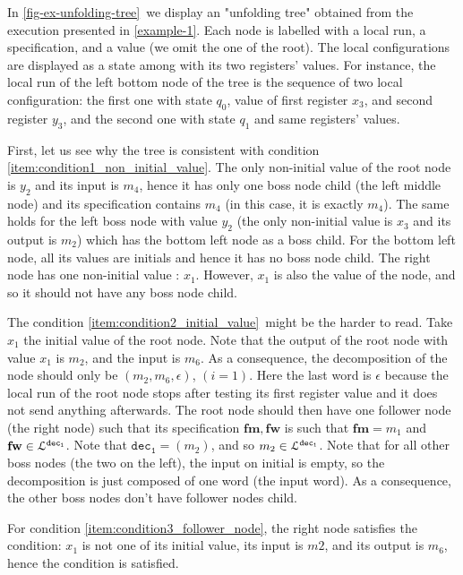 \begin{example}
	In \cref{fig-ex-unfolding-tree}~we display an "unfolding tree" obtained from the execution presented in \cref{example-1}. Each node is labelled with a local run, a specification, and a value (we omit the one of the root). The local configurations are displayed as a state among with its two registers' values. For instance, the local run of the left bottom node of the tree is the sequence of two local configuration: the first one with state $q_0$, value of first register $x_3$, and second register $y_3$, and the second one with state $q_1$ and same registers' values.
	
	First, let us see why the tree is consistent with condition \ref{item:condition1_non_initial_value}.
	The only non-initial value of the root node is $y_2$ and its input is $m_4$, hence it has only one boss node child (the left middle node) and its specification contains $m_4$ (in this case, it is exactly $m_4$). The same holds for the left boss node with value $y_2$ (the only non-initial value is $x_3$ and its output is $m_2$) which has the bottom left node as a boss child. For the bottom left node, all its values are initials and hence it has no boss node child. The right node has one non-initial value : $x_1$. However, $x_1$ is also the value of the node, and so it should not have any boss node child. 
	
	The condition \ref{item:condition2_initial_value}~might be the harder to read. Take $x_1$ the initial value of the root node. Note that the output of the root node with value $x_1$ is $m_2$, and the input is $m_6$. As a consequence, the decomposition of the node should only be $(m_2, m_6, \epsilon)$, $(i = 1)$. Here the last word is $\epsilon$ because the local run of the root node stops after testing its first register value and it does not send anything afterwards. The root node should then have one follower node (the right node) such that its specification $\mathbf{fm}, \mathbf{fw}$ is such that $\mathbf{fm} = m_1$ and $\mathbf{fw} \in \mathcal{L}^{\mathtt{dec_1}}$. Note that $\mathtt{dec_1} = (m_2)$, and so $m_2 \in \mathcal{L}^{\mathtt{dec_1}}$. Note that for all other boss nodes (the two on the left), the input on initial is empty, so the decomposition is just composed of one word (the input word). As a consequence, the other boss nodes don't have follower nodes child.
	
	For condition \ref{item:condition3_follower_node}, the right node satisfies the condition: $x_1$ is not one of its initial value, its input is $m2$, and its output is $m_6$, hence the condition is satisfied.
	

\end{example}
